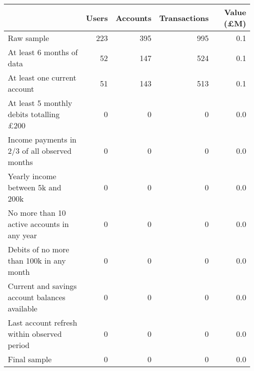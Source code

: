 \begin{tabular}{lrrrr}
\toprule
                                               & Users & Accounts & Transactions & Value (\pounds M) \\
\midrule
                                    Raw sample &   223 &      395 &          995 &               0.1 \\
                     At least 6 months of data &    52 &      147 &          524 &               0.1 \\
                  At least one current account &    51 &      143 &          513 &               0.1 \\
At least 5 monthly debits totalling \pounds200 &     0 &        0 &            0 &               0.0 \\
 Income payments in 2/3 of all observed months &     0 &        0 &            0 &               0.0 \\
             Yearly income between 5k and 200k &     0 &        0 &            0 &               0.0 \\
   No more than 10 active accounts in any year &     0 &        0 &            0 &               0.0 \\
      Debits of no more than 100k in any month &     0 &        0 &            0 &               0.0 \\
Current and savings account balances available &     0 &        0 &            0 &               0.0 \\
   Last account refresh within observed period &     0 &        0 &            0 &               0.0 \\
                                  Final sample &     0 &        0 &            0 &               0.0 \\
\bottomrule
\end{tabular}
